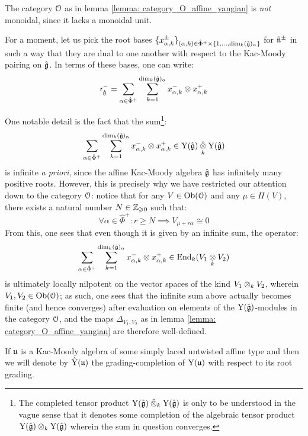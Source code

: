         \begin{remark}
            The category $\mathcal{O}$ as in lemma \ref{lemma: category_O_affine_yangian} is \textit{not} monoidal, since it lacks a monoidal unit. 
        \end{remark}
        \begin{remark}
            For a moment, let us pick the root bases $\{ x_{\alpha, k}^{\pm} \}_{(\alpha, k) \in \hat{\Phi}^+ \x \{1, ..., \dim_k (\hat{\g})_{\alpha} \}}$ for $\hat{\mathfrak{n}}^{\pm}$ in such a way that they are dual to one another with respect to the Kac-Moody pairing on $\hat{\mathfrak{g}}$. In terms of these bases, one can write:
                $$\sfr_{\hat{\g}}^- = \sum_{\alpha \in \hat{\Phi}^+} \sum_{k = 1}^{ \dim_k (\hat{\g})_{\alpha} } x_{\alpha, k}^- \tensor x_{\alpha, k}^+$$
        
            One notable detail is the fact that the sum\footnote{The completed tensor product $\rmY(\hat{\g}) \hattensor_k \rmY(\hat{\g})$ is only to be understood in the vague sense that it denotes some completion of the algebraic tensor product $\rmY(\hat{\g}) \tensor_k \rmY(\hat{\g})$ wherein the sum in question converges.}:
                $$\sum_{\alpha \in \hat{\Phi}^+} \sum_{k = 1}^{ \dim_k (\hat{\g})_{\alpha} } x_{\alpha, k}^- \tensor x_{\alpha, k}^+ \in \rmY(\hat{\g}) \hattensor_k \rmY(\hat{\g})$$
            is infinite \textit{a priori}, since the affine Kac-Moody algebra $\hat{\mathfrak{g}}$ has infinitely many positive roots. However, this is precisely why we have restricted our attention down to the category $\mathcal{O}$: notice that for any $V \in \mathrm{Ob}(\mathcal{O})$ and any $\mu \in \Pi(V)$, there exists a natural number $N \in \mathbb{Z}_{\geqslant 0}$ such that:
                $$\forall \alpha \in \hat{\Phi}^+: r \geq N \implies V_{\mu + r \alpha} \cong 0$$
            From this, one sees that even though it is given by an infinite sum, the operator:
                $$\sum_{\alpha \in \hat{\Phi}^+} \sum_{k = 1}^{ \dim_k (\hat{\g})_{\alpha} } x_{\alpha, k}^- \tensor x_{\alpha, k}^+ \in \End_k(V_1 \tensor_k V_2)$$
            is ultimately locally nilpotent on the vector spaces of the kind $V_1 \tensor_k V_2$, wherein $V_1, V_2 \in \mathrm{Ob}(\mathcal{O})$; as such, one sees that the infinite sum above actually becomes finite (and hence converges) after evaluation on elements of the $\mathrm{Y}(\hat{\mathfrak{g}})$-modules in the category $\mathcal{O}$, and the maps $\Delta_{V_1, V_2}$ as in lemma \ref{lemma: category_O_affine_yangian} are therefore well-defined. 
        \end{remark}
        \begin{convention}
            If $\mathfrak{u}$ is a Kac-Moody algebra of some simply laced untwisted affine type and then we will denote by $\hat{\mathrm{Y}}(\mathfrak{u})$ the grading-completion of $\mathrm{Y}(\mathfrak{u})$ with respect to its root grading.
        \end{convention}
